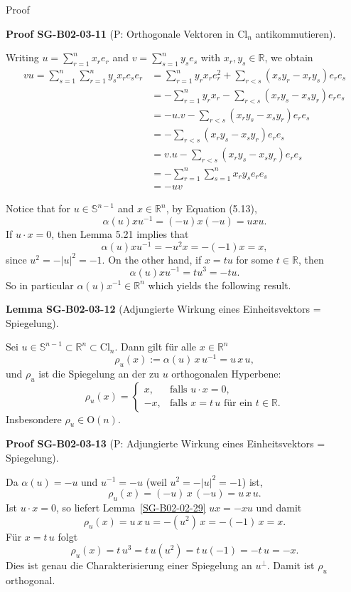 \documentclass[10pt, letterpaper]{article}
\newcommand{\R}{\mathbb{R}}
\newcommand{\Cl}{\mathrm{Cl}}
\newcommand{\CustomHeading}[3]{%
  \par\medskip\noindent%
  \textbf{#1 #2} \textnormal{(#3)}.\enskip%
}
\newenvironment{LEM}[2]{\begin{unitbox}\CustomHeading{Lemma}{#1}{#2}}{\end{unitbox}}
\newenvironment{PROOF}[2]{\begin{unitbox}\CustomHeading{Proof}{#1}{#2}}{\end{unitbox}}
\begin{document}
Proof

\begin{PROOF}{SG-B02-03-11}{P: Orthogonale Vektoren in $\Cl_n$ antikommutieren}
Writing $u=\sum_{r=1}^{n} x_{r} e_{r}$ and $v=\sum_{s=1}^{n} y_{s} e_{s}$ with $x_{r}, y_{s} \in \mathbb{R}$, we obtain
$$
\begin{aligned}
v u=\sum_{s=1}^{n} \sum_{r=1}^{n} y_{s} x_{r} e_{s} e_{r} & =\sum_{r=1}^{n} y_{r} x_{r} e_{r}^{2}+\sum_{r<s}\left(x_{s} y_{r}-x_{r} y_{s}\right) e_{r} e_{s} \\
& =-\sum_{r=1}^{n} y_{r} x_{r}-\sum_{r<s}\left(x_{r} y_{s}-x_{s} y_{r}\right) e_{r} e_{s} \\
& =-u . v-\sum_{r<s}\left(x_{r} y_{s}-x_{s} y_{r}\right) e_{r} e_{s} \\
& =-\sum_{r<s}\left(x_{r} y_{s}-x_{s} y_{r}\right) e_{r} e_{s} \\
& =v . u-\sum_{r<s}\left(x_{r} y_{s}-x_{s} y_{r}\right) e_{r} e_{s} \\
& =-\sum_{r=1}^{n} \sum_{s=1}^{n} x_{r} y_{s} e_{r} e_{s} \\
& =-u v
\end{aligned}
$$
\end{PROOF}


Notice that for $u \in \mathbb{S}^{n-1}$ and $x \in \mathbb{R}^{n}$, by Equation (5.13),
$$
\alpha(u) x u^{-1}=(-u) x(-u)=u x u .
$$
If $u \cdot x=0$, then Lemma 5.21 implies that
$$
\alpha(u) x u^{-1}=-u^{2} x=-(-1) x=x,
$$
since $u^{2}=-|u|^{2}=-1$. On the other hand, if $x=t u$ for some $t \in \mathbb{R}$, then
$$
\alpha(u) x u^{-1}=t u^{3}=-t u .
$$
So in particular $\alpha(u) x^{-1} \in \mathbb{R}^{n}$ which yields the following result.




\begin{LEM}{SG-B02-03-12}{Adjungierte Wirkung eines Einheitsvektors = Spiegelung}
Sei \(u\in \mathbb S^{n-1}\subset \R^n\subset \Cl_n\). Dann gilt für alle \(x\in\R^n\)
\[
\rho_u(x):=\alpha(u)\,x\,u^{-1}=u\,x\,u,
\]
und \(\rho_u\) ist die Spiegelung an der zu \(u\) orthogonalen Hyperbene:
\[
\rho_u(x)=
\begin{cases}
x,& \text{falls } u\cdot x=0,\\[2pt]
-x,& \text{falls } x=t\,u\text{ für ein }t\in\R.
\end{cases}
\]
Insbesondere \(\rho_u\in \mathrm O(n)\).
\end{LEM}



\begin{PROOF}{SG-B02-03-13}{P: Adjungierte Wirkung eines Einheitsvektors = Spiegelung}
Da \(\alpha(u)=-u\) und \(u^{-1}=-u\) (weil \(u^2=-|u|^2=-1\)) ist,
\[
\rho_u(x)=(-u)\,x\,(-u)=u\,x\,u.
\]
Ist \(u\cdot x=0\), so liefert Lemma~\ref{SG-B02-02-29} \(ux=-xu\) und damit
\[
\rho_u(x)=u\,x\,u=-(u^2)\,x=-(-1)\,x=x.
\]
Für \(x=t\,u\) folgt
\[
\rho_u(x)=t\,u^3 = t\,u(u^2)=t\,u(-1)=-t\,u=-x.
\]
Dies ist genau die Charakterisierung einer Spiegelung an \(u^\perp\). Damit ist \(\rho_u\) orthogonal.
\end{PROOF}
\end{document}
